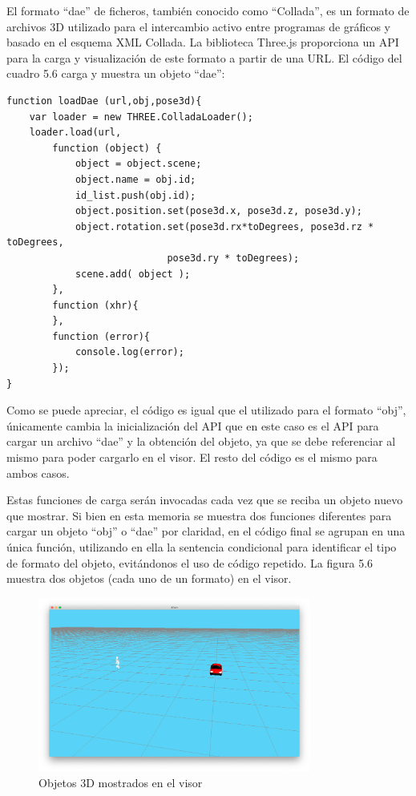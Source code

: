 \begin{itemize}
{El formato ``dae'' de ficheros, también conocido como ``Collada'', es un formato de archivos 3D utilizado para el intercambio activo entre programas de gráficos y basado en el esquema XML Collada. La biblioteca Three.js proporciona un API para la carga y visualización de este formato a partir de una URL. El código del cuadro 5.6 carga y muestra un objeto ``dae'':
\begin{lstlisting}[caption= Carga y visualización de objetos ``dae'', label=cod.objetosdae]
function loadDae (url,obj,pose3d){
	var loader = new THREE.ColladaLoader();
	loader.load(url, 
		function (object) {
			object = object.scene;
			object.name = obj.id;
			id_list.push(obj.id);
			object.position.set(pose3d.x, pose3d.z, pose3d.y);
			object.rotation.set(pose3d.rx*toDegrees, pose3d.rz * toDegrees, 
							pose3d.ry * toDegrees);
			scene.add( object );		
		},
		function (xhr){
		},
		function (error){
			console.log(error);
		});
}
\end{lstlisting}
Como se puede apreciar, el código es igual que el utilizado para el formato ``obj'', únicamente cambia la inicialización del API que en este caso es el API para cargar un archivo ``dae'' y la obtención del objeto, ya que se debe referenciar al mismo para poder cargarlo en el visor. El resto del código es el mismo para ambos casos.}
\end{itemize}
Estas funciones de carga serán invocadas cada vez que se reciba un objeto nuevo que mostrar. Si bien en esta memoria se muestra dos funciones diferentes para cargar un objeto ``obj'' o ``dae'' por claridad, en el código final se agrupan en una única función, utilizando en ella la sentencia condicional para identificar el tipo de formato del objeto, evitándonos el uso de código repetido. La figura 5.6 muestra dos objetos (cada uno de un formato) en el visor.

\begin{figure}[H]
  \begin{center}
    \includegraphics[width=0.8\textwidth]{figures/visualizarmodel.png}
		\caption{Objetos 3D mostrados en el visor}
		\label{fig.visualizarmodel}
		\end{center}
\end{figure}
